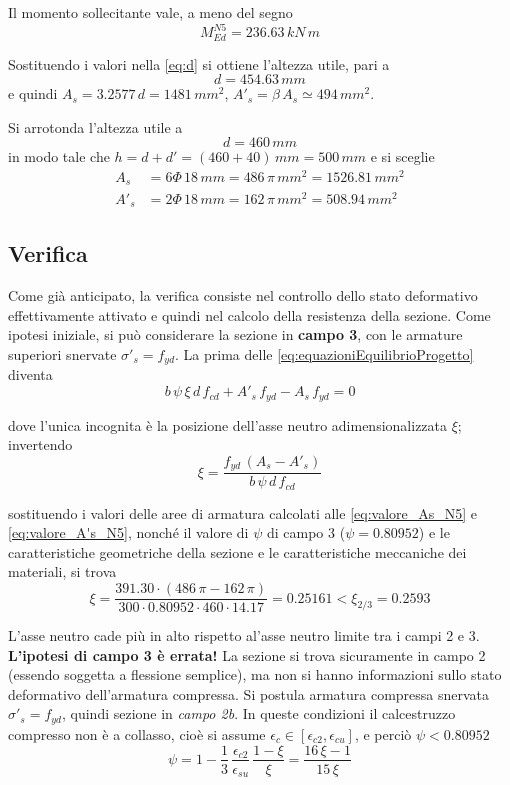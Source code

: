 Il momento sollecitante vale, a meno del segno
\[
M_{Ed}^{N5} = 236.63\,kN\,m
\]

Sostituendo i valori nella \eqref{eq:d} si ottiene l'altezza utile, pari a
\[
    d = 454.63\,mm
\]
e quindi $A_s = 3.2577\,d = 1481\,mm^2$, $A'_s = \beta\,A_s \simeq 494\,mm^2$.

Si arrotonda l'altezza utile a 
\begin{equation}
    \label{eq:valore_d}
	d = 460\,mm
\end{equation}
in modo tale che $h = d + d' = (460 + 40)\,mm = 500\,mm$ e si sceglie
\begin{align}
	\label{eq:valore_As_N5}
    A_s &= 6\Phi\,18\,mm = 486\,\pi\,mm^2 = 1526.81\,mm^2\\
	\label{eq:valore_A's_N5}
	A'_s &= 2\Phi\,18\,mm = 162\,\pi\,mm^2 = 508.94\,mm^2
\end{align}

\subsection{Verifica}
Come già anticipato, la verifica consiste nel controllo dello stato deformativo effettivamente attivato e quindi nel calcolo della resistenza della sezione. Come ipotesi iniziale, si può considerare la sezione in \textbf{campo 3}, con le armature superiori snervate $\sigma'_s = f_{yd}$. La prima delle \eqref{eq:equazioniEquilibrioProgetto} diventa
\begin{equation}
    \label{eq:equilibrioTraslazioneVerifica}
	b\,\psi\,\xi\,d\,f_{cd} + A'_s\,f_{yd} - A_s\,f_{yd} = 0
\end{equation}

dove l'unica incognita è la posizione dell'asse neutro adimensionalizzata $\xi$; invertendo
\begin{equation}
    \label{eq:xiVerifica}
	\xi = \dfrac{f_{yd}\,\left(A_s - A'_s\right)}{b\,\psi\,d\,f_{cd}}
\end{equation}

sostituendo i valori delle aree di armatura calcolati alle \eqref{eq:valore_As_N5}  e \eqref{eq:valore_A's_N5}, nonché il valore di $\psi$ di campo 3 ($\psi = 0.80952$) e le caratteristiche geometriche della sezione e le caratteristiche meccaniche dei materiali, si trova 
\[
\xi = \dfrac{391.30\cdot\left(486\,\pi - 162\,\pi\right)}{300\cdot 0.80952\cdot460\cdot14.17} = 0.25161 < \xi_{2/3} = 0.2593
\]

L'asse neutro cade più in alto rispetto al'asse neutro limite tra i campi 2 e 3. \textbf{L'ipotesi di campo 3 è errata!} La sezione si trova sicuramente in campo 2 (essendo soggetta a flessione semplice), ma non si hanno informazioni sullo stato deformativo dell'armatura compressa. Si postula armatura compressa snervata $\sigma'_s = f_{yd}$, quindi sezione in \textit{campo 2b}. In queste condizioni il calcestruzzo compresso non è a collasso, cioè si assume $\epsilon_c \in \left[\epsilon_{c2}, \epsilon_{cu}\right]$, e perciò $\psi < 0.80952$
\[
\psi = 1- \dfrac{1}{3}\,\dfrac{\epsilon_{c2}}{\epsilon_{su}}\,\dfrac{1-\xi}{\xi} = \dfrac{16\,\xi -1}{15\,\xi}
\]

